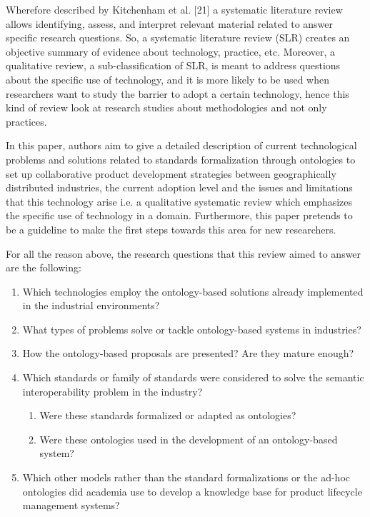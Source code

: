 \documentclass[peerreview]{IEEEtran}
\begin{document}
Wherefore described by Kitchenham et al. \cite{}[21] a systematic literature review allows identifying, assess, and interpret relevant material related to answer specific research questions. So, a systematic literature review (SLR) creates an objective summary of evidence about technology, practice, etc. Moreover, a qualitative review, a sub-classification of SLR, is meant to address questions about the specific use of technology, and it is more likely to be used when researchers want to study the barrier to adopt a certain technology, hence this kind of review look at research studies about methodologies and not only practices. 


In this paper, authors aim to give a detailed description of current technological problems and solutions related to standards formalization through ontologies to set up collaborative product development strategies between geographically distributed industries, the current adoption level and the issues and limitations that this technology arise i.e. a qualitative systematic review which emphasizes the specific use of technology in a domain. Furthermore, this paper pretends to be a guideline to make the first steps towards this area for new researchers.


For all the reason above, the research questions that this review aimed to answer are the following:
\begin{enumerate}
\item Which technologies employ the ontology-based solutions already implemented in the industrial environments?
\item What types of problems solve or tackle ontology-based systems in industries?
\item How the ontology-based proposals are presented? Are they mature enough? 
\item Which standards or family of standards were considered to solve the semantic interoperability problem in the industry?
\begin{enumerate}
\item Were these standards formalized or adapted as ontologies?
\item Were these ontologies used in the development of an ontology-based system?
\end{enumerate}
\item Which other models rather than the standard formalizations or the ad-hoc ontologies did academia use to develop a knowledge base for product lifecycle management systems?
\end{enumerate}
\end{document}
